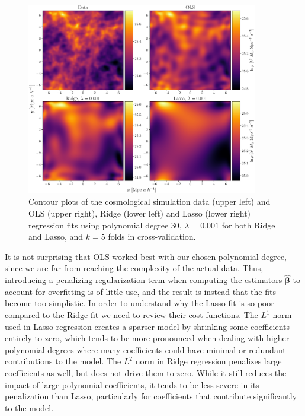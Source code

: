 \documentclass[aps,pra,english,notitlepage,reprint,nofootinbib]{revtex4-1}  %
\begin{document}
\begin{figure}
  \vspace*{-5pt}
  \centering %
  \includegraphics[width=0.9\textwidth]{../figs/density_OLS_Ridge_Lasso.pdf}
  \caption{Contour plots of the cosmological simulation data (upper left) and OLS (upper right), Ridge (lower left) and Lasso (lower right) regression fits using polynomial degree 30, $\lambda=0.001$ for both Ridge and Lasso, and $k=5$ folds in cross-validation.}\label{fig:density OLS Ridge Lasso}
  \vspace*{-5pt}
\end{figure}

It is not surprising that OLS worked best with our chosen polynomial degree, since we are far from reaching the complexity of the actual data. Thus, introducing a penalizing regularization term when computing the estimators $\boldsymbol{\hat{\beta}}$ to account for overfitting is of little use, and the result is instead that the fits become too simplistic. In order to understand why the Lasso fit is so poor compared to the Ridge fit we need to review their cost functions. The $L^1$ norm used in Lasso regression creates a sparser model by shrinking some coefficients entirely to zero, which tends to be more pronounced when dealing with higher polynomial degrees where many coefficients could have minimal or redundant contributions to the model. The $L^2$ norm in Ridge regression penalizes large coefficients as well, but does not drive them to zero. While it still reduces the impact of large polynomial coefficients, it tends to be less severe in its penalization than Lasso, particularly for coefficients that contribute significantly to the model.
\end{document}
